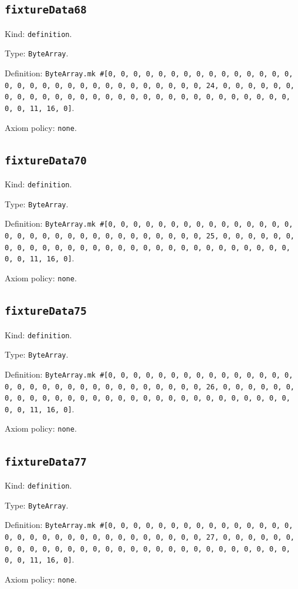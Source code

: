 \documentclass[11pt]{article}
\begin{document}
\subsection*{\texttt{fixtureData68}}
\noindent Kind: \texttt{definition}.\par
\noindent Type: \texttt{ByteArray}.\par
\noindent Definition: \texttt{ByteArray.mk \#[0, 0, 0, 0, 0, 0, 0, 0, 0, 0, 0, 0, 0, 0, 0, 0, 0, 0, 0, 0, 0, 0, 0, 0, 0, 0, 0, 0, 0, 0, 0, 24, 0, 0, 0, 0, 0, 0, 0, 0, 0, 0, 0, 0, 0, 0, 0, 0, 0, 0, 0, 0, 0, 0, 0, 0, 0, 0, 0, 0, 0, 0, 0, 11, 16, 0]}.\par
\noindent Axiom policy: \texttt{none}.\par
\subsection*{\texttt{fixtureData70}}
\noindent Kind: \texttt{definition}.\par
\noindent Type: \texttt{ByteArray}.\par
\noindent Definition: \texttt{ByteArray.mk \#[0, 0, 0, 0, 0, 0, 0, 0, 0, 0, 0, 0, 0, 0, 0, 0, 0, 0, 0, 0, 0, 0, 0, 0, 0, 0, 0, 0, 0, 0, 0, 25, 0, 0, 0, 0, 0, 0, 0, 0, 0, 0, 0, 0, 0, 0, 0, 0, 0, 0, 0, 0, 0, 0, 0, 0, 0, 0, 0, 0, 0, 0, 0, 11, 16, 0]}.\par
\noindent Axiom policy: \texttt{none}.\par
\subsection*{\texttt{fixtureData75}}
\noindent Kind: \texttt{definition}.\par
\noindent Type: \texttt{ByteArray}.\par
\noindent Definition: \texttt{ByteArray.mk \#[0, 0, 0, 0, 0, 0, 0, 0, 0, 0, 0, 0, 0, 0, 0, 0, 0, 0, 0, 0, 0, 0, 0, 0, 0, 0, 0, 0, 0, 0, 0, 26, 0, 0, 0, 0, 0, 0, 0, 0, 0, 0, 0, 0, 0, 0, 0, 0, 0, 0, 0, 0, 0, 0, 0, 0, 0, 0, 0, 0, 0, 0, 0, 11, 16, 0]}.\par
\noindent Axiom policy: \texttt{none}.\par
\subsection*{\texttt{fixtureData77}}
\noindent Kind: \texttt{definition}.\par
\noindent Type: \texttt{ByteArray}.\par
\noindent Definition: \texttt{ByteArray.mk \#[0, 0, 0, 0, 0, 0, 0, 0, 0, 0, 0, 0, 0, 0, 0, 0, 0, 0, 0, 0, 0, 0, 0, 0, 0, 0, 0, 0, 0, 0, 0, 27, 0, 0, 0, 0, 0, 0, 0, 0, 0, 0, 0, 0, 0, 0, 0, 0, 0, 0, 0, 0, 0, 0, 0, 0, 0, 0, 0, 0, 0, 0, 0, 11, 16, 0]}.\par
\noindent Axiom policy: \texttt{none}.\par
\end{document}
